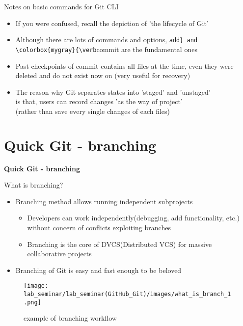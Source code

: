 \documentclass[11pt, xelatex]{beamer}
\newcommand{\bi}{\begin{itemize}}
\newcommand{\ei}{\end{itemize}}
\begin{document}
\begin{frame}{Notes on basic commands for Git CLI}
\bi
\item If you were confused, recall the depiction of 'the lifecycle of Git'
\item Although there are lots of commands and options, \colorbox{mygray}{\verb|add} and \colorbox{mygray}{\verb|commit} are the fundamental ones
\item Past checkpoints of commit contains all files at the time, even  they were deleted and do not exist now on (very useful for recovery)
\item The reason why Git separates states into 'staged' and 'unstaged' \\is that, users can record changes 'as the way of project'\\(rather than save every single changes of each files)
\ei
\end{frame}




\section{Quick Git - branching}
\begin{frame}
\Large
\centering
\textbf{Quick Git - branching}
\end{frame}

\begin{frame}{What is branching?}
\bi
\item Branching method allows running independent subprojects
    \bi
    \item Developers can work independently(debugging, add functionality, etc.) without concern of conflicts exploiting branches
    \item Branching is the core of DVCS(Distributed VCS) for massive collaborative projects
    \ei
\item Branching of Git is easy and fast enough to be beloved
\ei
\begin{figure}
	\texttt{[image: lab\_seminar/lab\_seminar(GitHub\_Git)/images/what\_is\_branch\_1.png]}
	\caption{example of branching workflow}
\end{figure}
\end{frame}
\end{document}
